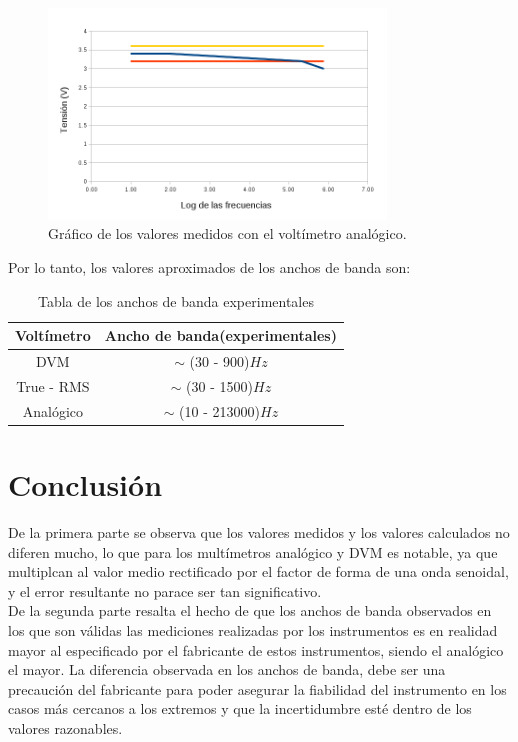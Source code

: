\documentclass{article}
\begin{document}
\begin{figure}[h!tbp]
\centering
\includegraphics[width=0.80\textwidth]{images/tablaANA.png}
\caption{Gráfico de los valores medidos con el voltímetro analógico.}
\end{figure}
\bigskip

Por lo tanto, los valores aproximados de los anchos de banda son:

\begin{table}[!hbt]
	\begin{center}
	\begin{tabular}{|c|c|}\hline
	\textbf{Voltímetro} & \textbf{Ancho de banda(experimentales)}\\ \hline
    DVM &  $\sim$ (30 - 900)$Hz$\\ \hline
    True - RMS &  $\sim$ (30 - 1500)$Hz$\\ \hline
    Analógico & $\sim$ (10 - 213000)$Hz$\\ \hline
	\end{tabular}
	\caption{Tabla de los anchos de banda experimentales}
	\end{center}
\end{table}\bigskip

\section{Conclusión}

\indent De la primera parte se observa que los valores medidos y los valores calculados no diferen mucho, lo que para los multímetros analógico y DVM es notable, ya que multiplcan al valor medio rectificado por el factor de forma de una onda senoidal, y el error resultante no parace ser tan significativo.\\\medskip
\indent De la segunda parte resalta el hecho de que los anchos de banda observados en los que son válidas las mediciones realizadas por los instrumentos es en realidad mayor al especificado por el fabricante de estos instrumentos, siendo el analógico el mayor. La diferencia observada en los anchos de banda, debe ser una precaución del fabricante para poder asegurar la fiabilidad del instrumento en los casos más cercanos a los extremos y que la incertidumbre esté dentro de los valores razonables.
\end{document}

